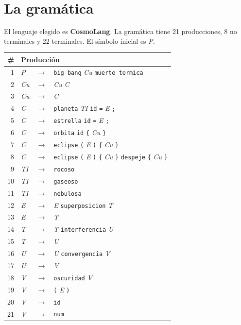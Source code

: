 \documentclass[12pt, letterpaper]{article}
\newcommand{\nt}[1]{\textit{#1}}          %
\newcommand{\tl}[1]{\texttt{#1}}          %
\newcommand{\der}{\ensuremath{\rightarrow}}
\begin{document}
\section{La gramática}

El lenguaje elegido es \textbf{CosmoLang}. La
gramática tiene 21 producciones, 8 no terminales y 22 terminales. El
símbolo inicial es \nt{P}.

\begin{center}
\begin{tabular}{r l c l}
\toprule
\# & \multicolumn{3}{l}{Producción} \\
\midrule
 1 & \nt{P}  & \der & \tl{big\_bang} \nt{Cu} \tl{muerte\_termica} \\
 2 & \nt{Cu} & \der & \nt{Cu} \nt{C} \\
 3 & \nt{Cu} & \der & \nt{C} \\
 4 & \nt{C}  & \der & \tl{planeta} \nt{TI} \tl{id} \tl{=} \nt{E} \tl{;} \\
 5 & \nt{C}  & \der & \tl{estrella} \tl{id} \tl{=} \nt{E} \tl{;} \\
 6 & \nt{C}  & \der & \tl{orbita} \tl{id} \tl{\{} \nt{Cu} \tl{\}} \\
 7 & \nt{C}  & \der & \tl{eclipse} \tl{(} \nt{E} \tl{)} \tl{\{} \nt{Cu} \tl{\}} \\
 8 & \nt{C}  & \der & \tl{eclipse} \tl{(} \nt{E} \tl{)} \tl{\{} \nt{Cu} \tl{\}} \tl{despeje} \tl{\{} \nt{Cu} \tl{\}} \\
 9 & \nt{TI} & \der & \tl{rocoso} \\
10 & \nt{TI} & \der & \tl{gaseoso} \\
11 & \nt{TI} & \der & \tl{nebulosa} \\
12 & \nt{E}  & \der & \nt{E} \tl{superposicion} \nt{T} \\
13 & \nt{E}  & \der & \nt{T} \\
14 & \nt{T}  & \der & \nt{T} \tl{interferencia} \nt{U} \\
15 & \nt{T}  & \der & \nt{U} \\
16 & \nt{U}  & \der & \nt{U} \tl{convergencia} \nt{V} \\
17 & \nt{U}  & \der & \nt{V} \\
18 & \nt{V}  & \der & \tl{oscuridad} \nt{V} \\
19 & \nt{V}  & \der & \tl{(} \nt{E} \tl{)} \\
20 & \nt{V}  & \der & \tl{id} \\
21 & \nt{V}  & \der & \tl{num} \\
\bottomrule
\end{tabular}
\end{center}
\end{document}
